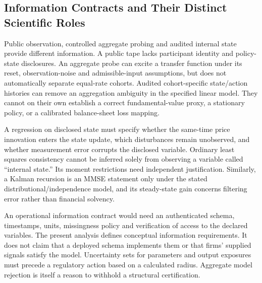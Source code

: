 \subsection{Information Contracts and Their Distinct Scientific Roles}
Public observation, controlled aggregate probing and audited internal state provide different information. A public tape lacks participant identity and policy-state disclosures. An aggregate probe can excite a transfer function under its reset, observation-noise and admissible-input assumptions, but does not automatically separate equal-rate cohorts. Audited cohort-specific state/action histories can remove an aggregation ambiguity in the specified linear model. They cannot on their own establish a correct fundamental-value proxy, a stationary policy, or a calibrated balance-sheet loss mapping.

A regression on disclosed state must specify whether the same-time price innovation enters the state update, which disturbances remain unobserved, and whether measurement error corrupts the disclosed variable. Ordinary least squares consistency cannot be inferred solely from observing a variable called ``internal state.'' Its moment restrictions need independent justification. Similarly, a Kalman recursion is an MMSE statement only under the stated distributional/independence model, and its steady-state gain concerns filtering error rather than financial solvency.

An operational information contract would need an authenticated schema, timestamps, units, missingness policy and verification of access to the declared variables. The present analysis defines conceptual information requirements. It does not claim that a deployed schema implements them or that firms' supplied signals satisfy the model. Uncertainty sets for parameters and output exposures must precede a regulatory action based on a calculated radius. Aggregate model rejection is itself a reason to withhold a structural certification.

